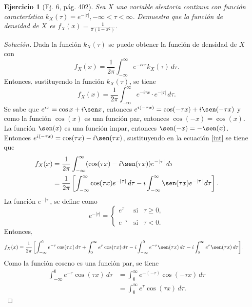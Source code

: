 \documentclass[12pt,letterpaper]{article}
\newcommand\integral[4]{\ensuremath{\int_{#1}^{#2} #3 \, d#4}}
\newtheorem{ej}{Ejercicio}
\begin{document}
\begin{ej}[Ej. 6, pág. 402]
Sea $X$ una variable aleatoria continua con función característica $k_{X}(\tau)=e^{-|\tau|}, -\infty < \tau < \infty$. Demuestra que la función de densidad de $X$ es $f_{X}(x)=\frac{1}{\pi(1-x^2)}$.
\end{ej}
\begin{proof}[Solución]
Dada la función $k_{X}(\tau)$ se puede obtener la función de densidad de $X$ \cite{snell} con
\begin{equation}
f_{X}(x) = \frac{1}{2\pi}\integral{-\infty}{\infty}{e^{-i\tau x}k_{X}(\tau)}{\tau}.
\end{equation}
Entonces, sustituyendo la función $k_{X}(\tau)$, se tiene
\begin{equation}
\label{int}
f_{X}(x) = \frac{1}{2\pi} \integral{-\infty}{\infty}{e^{-i\tau x} \cdot e^{-|\tau|}}{\tau}.
\end{equation}
Se sabe que $e^{ix}=\cos x + i \sen x$, entonces $e^{i(-\tau x)}=\cos(-\tau x) + i \sen (-\tau x)$ y como la función $\cos(x)$ es una función par, entonces $\cos (-x) = \cos (x)$. La función $\sen(x)$ es una función impar, entonces $\sen(-x)=-\sen(x)$. Entonces $e^{i(-\tau x)} = \cos(\tau x) - i\sen(\tau x)$, sustituyendo en la ecuación \ref{int} se tiene que
\begin{align}
f_{X}(x) &=\frac{1}{2\pi} \integral{-\infty}{\infty}{ (\cos (\tau x) - i\sen (\tau x))e^{-|	\tau|}}{\tau} \\
&=\frac{1}{2	\pi}\left[ \integral{-\infty}{\infty}{ \cos (\tau x) e^{-|\tau|}}{\tau} - i \integral{-\infty}{\infty}{ \sen (\tau x) e^{-|\tau|}}{\tau}\right].
\end{align}
La función $e^{-|\tau|}$, se define como
\begin{equation}
e^{-|\tau|}= \left\{ \begin{array}{lcc}
             e^{\tau} &   \text{si}  & \tau \geqslant 0, \\
             \\ e^{-\tau} &  \text{si} & \tau < 0. 
             \end{array}
   \right.
\end{equation}
Entonces,
\begin{align}
f_{X}(x) &= \frac{1}{2\pi}\left[\integral{-\infty}{0}{e^{-\tau}\cos(\tau x)}{\tau} + \integral{0}{\infty}{e^{\tau}\cos(\tau x)}{\tau} - i\integral{-\infty}{0}{e^{-\tau}\sen(\tau x)}{\tau} -i \integral{0}{\infty}{e^{\tau}\sen(\tau x)}{\tau}\right].
\end{align}
Como la función coseno es una función par, se tiene
\begin{align}
\integral{-\infty}{0}{e^{-\tau}\cos(\tau x)}{\tau} & = \integral{0}{\infty}{e^{-(-\tau)}\cos(-\tau x)}{\tau} \\
&= \integral{0}{\infty}{e^{\tau}\cos(\tau x)}{\tau}.
\end{align}


\end{proof}
\end{document}
